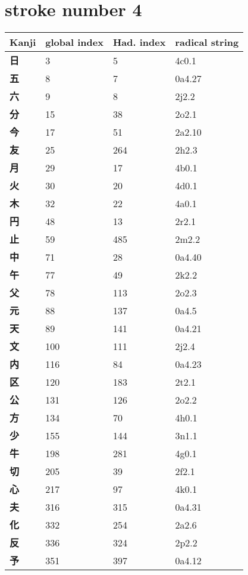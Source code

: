 \section{stroke number 4}
  \begin{longtable}[c]{llll}
    \bfseries Kanji & \bfseries global index & \bfseries Had. index & \bfseries radical string\\\hline\endhead
    \bfseries 日 & 3 & 5 & 4c0.1\\
    \bfseries 五 & 8 & 7 & 0a4.27\\
    \bfseries 六 & 9 & 8 & 2j2.2\\
    \bfseries 分 & 15 & 38 & 2o2.1\\
    \bfseries 今 & 17 & 51 & 2a2.10\\
    \bfseries 友 & 25 & 264 & 2h2.3\\
    \bfseries 月 & 29 & 17 & 4b0.1\\
    \bfseries 火 & 30 & 20 & 4d0.1\\
    \bfseries 木 & 32 & 22 & 4a0.1\\
    \bfseries 円 & 48 & 13 & 2r2.1\\
    \bfseries 止 & 59 & 485 & 2m2.2\\
    \bfseries 中 & 71 & 28 & 0a4.40\\
    \bfseries 午 & 77 & 49 & 2k2.2\\
    \bfseries 父 & 78 & 113 & 2o2.3\\
    \bfseries 元 & 88 & 137 & 0a4.5\\
    \bfseries 天 & 89 & 141 & 0a4.21\\
    \bfseries 文 & 100 & 111 & 2j2.4\\
    \bfseries 内 & 116 & 84 & 0a4.23\\
    \bfseries 区 & 120 & 183 & 2t2.1\\
    \bfseries 公 & 131 & 126 & 2o2.2\\
    \bfseries 方 & 134 & 70 & 4h0.1\\
    \bfseries 少 & 155 & 144 & 3n1.1\\
    \bfseries 牛 & 198 & 281 & 4g0.1\\
    \bfseries 切 & 205 & 39 & 2f2.1\\
    \bfseries 心 & 217 & 97 & 4k0.1\\
    \bfseries 夫 & 316 & 315 & 0a4.31\\
    \bfseries 化 & 332 & 254 & 2a2.6\\
    \bfseries 反 & 336 & 324 & 2p2.2\\
    \bfseries 予 & 351 & 397 & 0a4.12\\

\end{longtable}
